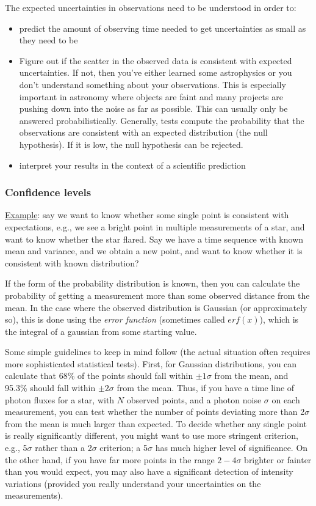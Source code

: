 \documentclass[12pt]{article}
\begin{document}
The expected uncertainties in observations need to be understood in order to:
\begin{itemize}
    \item predict the amount of observing time needed to get
        uncertainties as small as they need to be
    \item Figure out if the scatter in the observed data is consistent
        with expected uncertainties. If not, then you've either learned some
        astrophysics or you don't understand something about your observations.
        This is especially important in astronomy where objects are faint and
        many projects are pushing down into the noise as far as possible. This
        can usually only be answered probabilistically. Generally, tests
        compute the probability that the observations are consistent with an
        expected distribution (the null hypothesis). If it is low, the null
        hypothesis can be rejected.
    \item interpret your results in the context of a scientific prediction
\end{itemize}

\subsubsection{Confidence levels}
\underline{Example}: say we want to know whether some single point is
consistent with expectations, e.g., we see a bright point in multiple
measurements of a star, and want to know whether the star flared. Say we have a
time sequence with known mean and variance, and we obtain a new point, and want
to know whether it is consistent with known distribution?

If the form of the probability distribution is known, then you can calculate
the probability of getting a measurement more than some observed distance from
the mean. In the case where the observed distribution is Gaussian (or
approximately so), this is done using the \textit{error function} (sometimes
called $erf(x)$), which is the integral of a gaussian from some starting value.

Some simple guidelines to keep in mind follow (the actual situation often
requires more sophisticated statistical tests). First, for Gaussian
distributions, you can calculate that 68\% of the points should fall within
$\pm 1\sigma$ from the mean, and 95.3\% should fall within $\pm 2\sigma$ from
the mean. Thus, if you have a time line of photon fluxes for a star, with $N$
observed points, and a photon noise $\sigma$ on each measurement, you can test
whether the number of points deviating more than 2$\sigma$ from the mean is
much larger than expected. To decide whether any single point is really
significantly different, you might want to use more stringent criterion, e.g.,
5$\sigma$ rather than a 2$\sigma$ criterion; a 5$\sigma$ has much higher level
of significance. On the other hand, if you have far more points in the range
$2-4\sigma$ brighter or fainter than you would expect, you may also have a
significant detection of intensity variations (provided you really understand
your uncertainties on the measurements).
\end{document}
